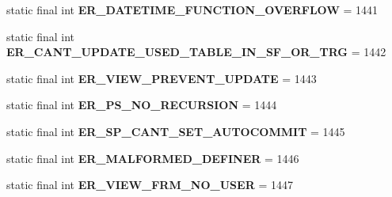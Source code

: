 \begin{DoxyCompactItemize}
static final int {\bfseries E\+R\+\_\+\+D\+A\+T\+E\+T\+I\+M\+E\+\_\+\+F\+U\+N\+C\+T\+I\+O\+N\+\_\+\+O\+V\+E\+R\+F\+L\+OW} = 1441
\item 
\mbox{\label{classcom_1_1mysql_1_1cj_1_1exceptions_1_1_mysql_error_numbers_a3f358a3f307d5ddd603a67716c5d4394}} 
static final int {\bfseries E\+R\+\_\+\+C\+A\+N\+T\+\_\+\+U\+P\+D\+A\+T\+E\+\_\+\+U\+S\+E\+D\+\_\+\+T\+A\+B\+L\+E\+\_\+\+I\+N\+\_\+\+S\+F\+\_\+\+O\+R\+\_\+\+T\+RG} = 1442
\item 
\mbox{\label{classcom_1_1mysql_1_1cj_1_1exceptions_1_1_mysql_error_numbers_aa9f77f68b41d439449127928db981309}} 
static final int {\bfseries E\+R\+\_\+\+V\+I\+E\+W\+\_\+\+P\+R\+E\+V\+E\+N\+T\+\_\+\+U\+P\+D\+A\+TE} = 1443
\item 
\mbox{\label{classcom_1_1mysql_1_1cj_1_1exceptions_1_1_mysql_error_numbers_a7ba2f6ddd0353f83c7268993eabfc5a7}} 
static final int {\bfseries E\+R\+\_\+\+P\+S\+\_\+\+N\+O\+\_\+\+R\+E\+C\+U\+R\+S\+I\+ON} = 1444
\item 
\mbox{\label{classcom_1_1mysql_1_1cj_1_1exceptions_1_1_mysql_error_numbers_ae816ea927450166a735012f227a4e462}} 
static final int {\bfseries E\+R\+\_\+\+S\+P\+\_\+\+C\+A\+N\+T\+\_\+\+S\+E\+T\+\_\+\+A\+U\+T\+O\+C\+O\+M\+M\+IT} = 1445
\item 
\mbox{\label{classcom_1_1mysql_1_1cj_1_1exceptions_1_1_mysql_error_numbers_a7c7f55a402ec116fe0843d15a620eb68}} 
static final int {\bfseries E\+R\+\_\+\+M\+A\+L\+F\+O\+R\+M\+E\+D\+\_\+\+D\+E\+F\+I\+N\+ER} = 1446
\item 
\mbox{\label{classcom_1_1mysql_1_1cj_1_1exceptions_1_1_mysql_error_numbers_a547acb2e06a8bb83fe83e0d56a072fa9}} 
static final int {\bfseries E\+R\+\_\+\+V\+I\+E\+W\+\_\+\+F\+R\+M\+\_\+\+N\+O\+\_\+\+U\+S\+ER} = 1447
\item 
\mbox{\label{classcom_1_1mysql_1_1cj_1_1exceptions_1_1_mysql_error_numbers_af8e641e664688c22588b00eecb5b8ed0}} 

\end{DoxyCompactItemize}
